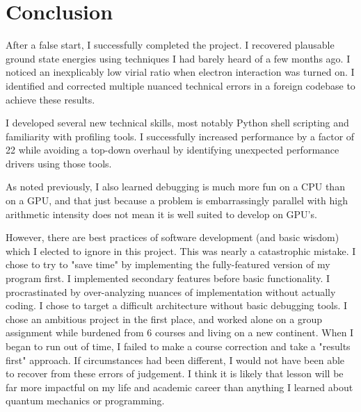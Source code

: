 \documentclass[11pt, conference, compsocconf]{IEEEtran}
\begin{document}
\section{Conclusion}
After a false start, I successfully completed the project. I recovered plausable ground state energies using techniques I had barely heard of a few months ago. I noticed an inexplicably low virial ratio when electron interaction was turned on. I identified and corrected multiple nuanced technical errors in a foreign codebase to achieve these results.

I developed several new technical skills, most notably Python shell scripting and familiarity with profiling tools. I successfully increased performance by a factor of 22 while avoiding a top-down overhaul by identifying unexpected performance drivers using those tools. 

As noted previously, I also learned debugging is much more fun on a CPU than on a GPU, and that just because a problem is embarrassingly parallel with high arithmetic intensity does not mean it is well suited to develop on GPU's. 

However, there are best practices of software development (and basic wisdom) which I elected to ignore in this project. This was nearly a catastrophic mistake. I chose to try to "save time" by implementing the fully-featured version of my program first. I implemented secondary features before basic functionality. I procrastinated by over-analyzing nuances of implementation without actually coding. I chose to target a difficult architecture without basic debugging tools. I chose an ambitious project in the first place, and worked alone on a group assignment while burdened from 6 courses and living on a new continent. When I began to run out of time, I failed to make a course correction and take a "results first" approach. If circumstances had been different, I would not have been able to recover from these errors of judgement. I think it is likely that lesson will be far more impactful on my life and academic career than anything I learned about quantum mechanics or programming.
\end{document}
